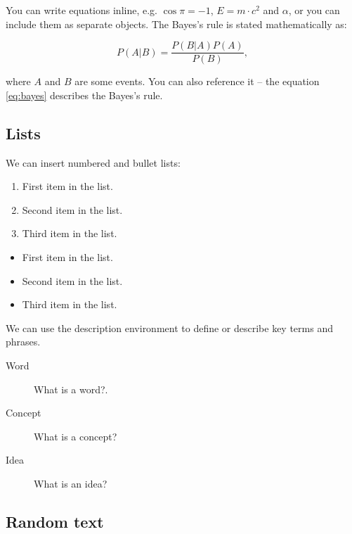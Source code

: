 \documentclass[fleqn,moreauthors,10pt]{ds_report}
\begin{document}
You can write equations inline, e.g. $\cos\pi=-1$, $E = m \cdot c^2$ and $\alpha$, or you can include them as separate objects. The Bayes’s rule is stated mathematically as:

\begin{equation}
	P(A|B) = \frac{P(B|A)P(A)}{P(B)},
	\label{eq:bayes}
\end{equation}

where $A$ and $B$ are some events. You can also reference it -- the equation \ref{eq:bayes} describes the Bayes's rule.

\subsection*{Lists}

We can insert numbered and bullet lists:

\begin{enumerate}[noitemsep] 
	\item First item in the list.
	\item Second item in the list.
	\item Third item in the list.
\end{enumerate}

\begin{itemize}[noitemsep] 
	\item First item in the list.
	\item Second item in the list.
	\item Third item in the list.
\end{itemize}

We can use the description environment to define or describe key terms and phrases.

\begin{description}
	\item[Word] What is a word?.
	\item[Concept] What is a concept?
	\item[Idea] What is an idea?
\end{description}


\subsection*{Random text}
\end{document}
